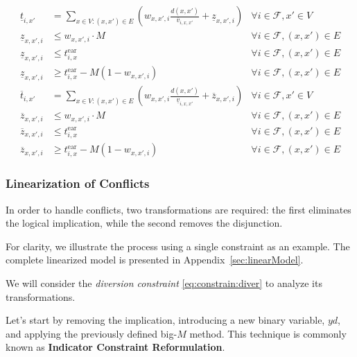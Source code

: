 \documentclass[../../thesis.tex]{subfiles}
\begin{document}
\begin{align}
    \underline t_{i,x'} &= \sum_{x\in V: (x,x')\in E} \left(w_{x,x',i} \frac{d(x,x')}{\overline v_{i,x,x'}} + \underline z_{x,x',i}\right)
    &\forall i\in \mathcal{F}, x'\in V\\
    \underline z_{x,x',i} &\leq w_{x,x',i}\cdot M &\forall i\in \mathcal{F}, (x,x')\in E\\
    \underline z_{x,x',i} &\leq t^\text{ear}_{i,x} &\forall i\in \mathcal{F}, (x,x')\in E\\
    \underline z_{x,x',i} &\geq t^\text{ear}_{i,x} - M (1-w_{x,x',i}) &\forall i\in \mathcal{F}, (x,x')\in E\\
    \overline t_{i,x'} &= \sum_{x\in V: (x,x')\in E}\left(w_{x,x',i}\frac{d(x,x')}{\underline v_{i,x,x'}}+\overline z_{x,x',i}\right) 
    &\forall i \in \mathcal{F}, x'\in V\\
    \overline z_{x,x',i} &\leq w_{x,x',i}\cdot M &\forall i\in \mathcal{F}, (x,x')\in E\\
    \overline z_{x,x',i} &\leq t^\text{ear}_{i,x} &\forall i\in \mathcal{F}, (x,x')\in E\\
    \overline z_{x,x',i} &\geq t^\text{ear}_{i,x} - M (1-w_{x,x',i}) &\forall i\in \mathcal{F}, (x,x')\in E
\end{align}



\subsubsection{Linearization of Conflicts}  
In order to handle conflicts, two transformations are required: the first eliminates the logical implication, while the second removes the disjunction.

For clarity, we illustrate the process using a single constraint as an example. The complete linearized model is presented in Appendix~\ref{sec:linearModel}.  

We will consider the \textit{diversion constraint} \ref{eq:constrain:diver} to analyze its transformations.

Let's start by removing the implication, introducing a new binary variable, $yd$, and applying the previously defined big-$M$ method.  
This technique is commonly known as \textbf{Indicator Constraint Reformulation}.
\end{document}
